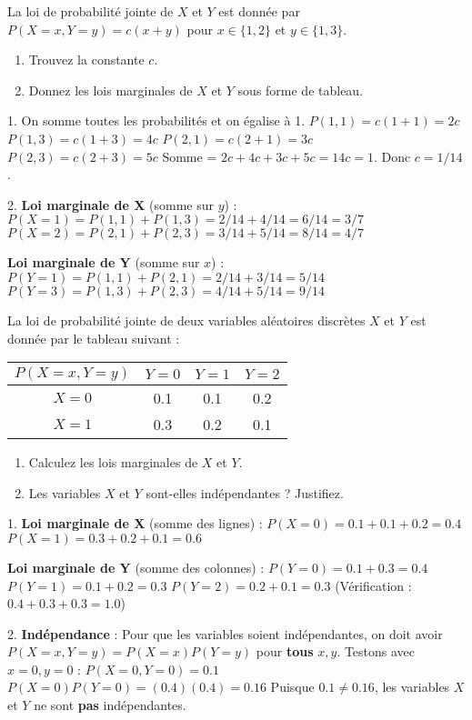 \begin{exercicebox}
La loi de probabilité jointe de $X$ et $Y$ est donnée par $P(X=x, Y=y) = c(x+y)$ pour $x \in \{1, 2\}$ et $y \in \{1, 3\}$.
\begin{enumerate}
    \item Trouvez la constante $c$.
    \item Donnez les lois marginales de $X$ et $Y$ sous forme de tableau.
\end{enumerate}
\end{exercicebox}

\begin{correctionbox}
1. On somme toutes les probabilités et on égalise à 1.
$P(1,1) = c(1+1) = 2c$
$P(1,3) = c(1+3) = 4c$
$P(2,1) = c(2+1) = 3c$
$P(2,3) = c(2+3) = 5c$
Somme = $2c + 4c + 3c + 5c = 14c = 1$. Donc $c = 1/14$.

2. \textbf{Loi marginale de X} (somme sur $y$) :
$P(X=1) = P(1,1) + P(1,3) = 2/14 + 4/14 = 6/14 = 3/7$
$P(X=2) = P(2,1) + P(2,3) = 3/14 + 5/14 = 8/14 = 4/7$

\textbf{Loi marginale de Y} (somme sur $x$) :
$P(Y=1) = P(1,1) + P(2,1) = 2/14 + 3/14 = 5/14$
$P(Y=3) = P(1,3) + P(2,3) = 4/14 + 5/14 = 9/14$
\end{correctionbox}

\begin{exercicebox}
La loi de probabilité jointe de deux variables aléatoires discrètes $X$ et $Y$ est donnée par le tableau suivant :

\begin{center}
\begin{tabular}{|c|c|c|c|}
\hline
$P(X=x, Y=y)$ & $Y=0$ & $Y=1$ & $Y=2$ \\
\hline
$X=0$ & 0.1 & 0.1 & 0.2 \\
\hline
$X=1$ & 0.3 & 0.2 & 0.1 \\
\hline
\end{tabular}
\end{center}

\begin{enumerate}
    \item Calculez les lois marginales de $X$ et $Y$.
    \item Les variables $X$ et $Y$ sont-elles indépendantes ? Justifiez.
\end{enumerate}
\end{exercicebox}

\begin{correctionbox}
1. \textbf{Loi marginale de X} (somme des lignes) :
$P(X=0) = 0.1 + 0.1 + 0.2 = 0.4$
$P(X=1) = 0.3 + 0.2 + 0.1 = 0.6$

\textbf{Loi marginale de Y} (somme des colonnes) :
$P(Y=0) = 0.1 + 0.3 = 0.4$
$P(Y=1) = 0.1 + 0.2 = 0.3$
$P(Y=2) = 0.2 + 0.1 = 0.3$
(Vérification : $0.4+0.3+0.3=1.0$)

2. \textbf{Indépendance} :
Pour que les variables soient indépendantes, on doit avoir $P(X=x, Y=y) = P(X=x)P(Y=y)$ pour \textbf{tous} $x, y$.
Testons avec $x=0, y=0$ :
$P(X=0, Y=0) = 0.1$
$P(X=0)P(Y=0) = (0.4)(0.4) = 0.16$
Puisque $0.1 \neq 0.16$, les variables $X$ et $Y$ ne sont \textbf{pas} indépendantes.
\end{correctionbox}

